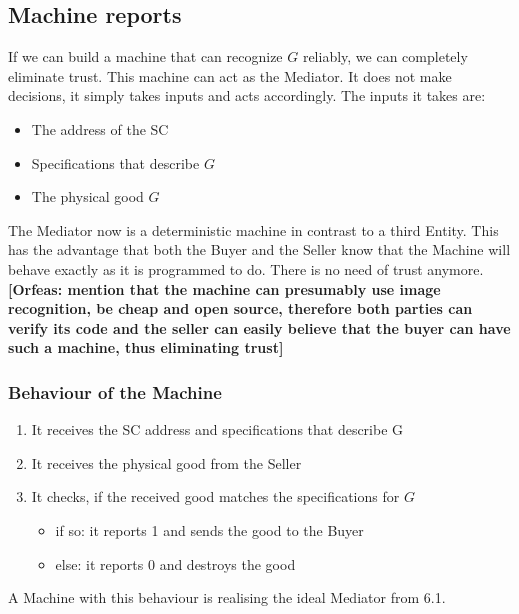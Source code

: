 \documentclass{cacthesis}
\newcommand{\authnote}[3]{{ \footnotesize \textbf{#1[#2: #3]~}}}
\newcommand{\orfnote}[1]{\authnote{\color{blue}}{Orfeas}{#1}}
\begin{document}
\subsection{Machine reports}
If we can build a machine that can recognize $G$ reliably, we can completely eliminate trust. This machine can act as the Mediator. It does not make decisions, it simply takes inputs and acts accordingly.\newline
The inputs it takes are:
\begin{itemize}
    \item The address of the SC
    \item Specifications that describe $G$
    \item The physical good $G$
\end{itemize}

The Mediator now is a deterministic machine in contrast to a third Entity. This
has the advantage that both the Buyer and the Seller know that the Machine will
behave exactly as it is programmed to do. There is no need of trust anymore.
\orfnote{mention that the machine can presumably use image recognition, be cheap
and open source, therefore both parties can verify its code and the seller can
easily believe that the buyer can have such a machine, thus eliminating trust}\newline

\subsubsection{Behaviour of the Machine}
\begin{enumerate}
    \item It receives the SC address and specifications that describe G
    \item It receives the physical good from the Seller
    \item It checks, if the received good matches the specifications for $G$
        \begin{itemize}
            \item if so: it reports 1 and sends the good to the Buyer
            \item else: it reports 0 and destroys the good
        \end{itemize}
\end{enumerate}
A Machine with this behaviour is realising the ideal Mediator from 6.1. 
\end{document}
